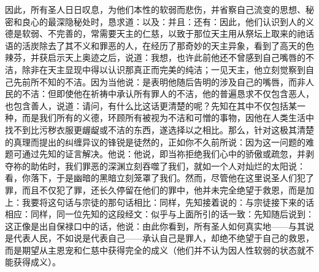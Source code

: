 因此，所有圣人日日叹息，为他们本性的软弱而悲伤，并省察自己流变的思想、秘密和良心的最深隐秘处时，恳求道：以及：并且：还有：因此，他们认识到人的义德是软弱、不完善的，常需要天主的仁慈，以致于那位天主用从祭坛上取来的祂话语的活炭除去了其不义和罪恶的人，在经历了那奇妙的天主异象，看到了高天的色辣芬，并获启示天上奥迹之后，说道：我想，也许此前他还不曾感到自己嘴唇的不洁，除非在天主显现中得以认识那真正而完美的纯洁；一见天主，他立刻觉察到自己先前所不知的不洁。因为当他说：是表明他随后告明的涉及自己的嘴唇，而非人民的不洁：但即使他在祈祷中承认所有罪人的不洁，他的普遍恳求不仅包含恶人，也包含善人，说道：请问，有什么比这话更清楚的呢？先知在其中不仅包括某一种，而是我们所有的义德，环顾所有被视为不洁和可憎的事物，因他在人类生活中找不到比污秽衣服更龌龊或不洁的东西，遂选择以之相比。那么，针对这极其清楚的真理而提出的纠缠异议的锋锐是徒然的，正如你不久前所说：因为这一问题的难题可通过先知的证言解决。他说：他说，即当祢拒绝我们心中的骄傲或疏忽，并剥夺祢的助佑时，我们罪恶的深渊立刻吞噬了我们，就如一个人对灿烂的太阳说：看，你落下，于是幽暗的黑暗立刻笼罩了我们。然而，尽管他在这里说圣人们犯了罪，而且不仅犯了罪，还长久停留在他们的罪中，他并未完全绝望于救恩，而是加上：我要将这句话与宗徒的那句话相比：同样，先知接着说的：与宗徒接下来的话相应：同样，同一位先知的这段经文：似乎与上面所引的话一致：先知随后说到：这正像是出自保禄口中的话，他说：由此你看到，所有圣人如何真实地——与其说是代表人民，不如说是代表自己——承认自己是罪人，却绝不绝望于自己的救恩，而是期望从主恩宠和仁慈中获得完全的成义（他们并不认为因人性软弱的状态就不能获得成义）。\par


